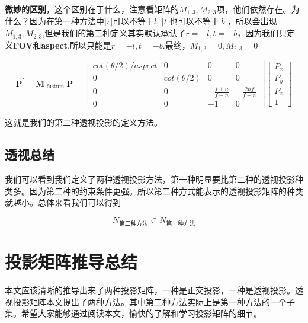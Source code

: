 \documentclass{article} \usepackage{braket} \usepackage{amsmath,amssymb} \usepackage{geometry} \usepackage{graphicx} \usepackage{braket} \usepackage{bm}\usepackage{hyperref} \usepackage{CJKutf8}
\begin{document}
\begin{CJK}{UTF8}{gbsn}
  \textbf{微妙的区别}，这个区别在于什么，注意看矩阵的$M_{1,3},M_{2,3}$项，他们依然存在。为什么？因为在第一种方法中$|r|$可以不等于$l$, $|t|$也可以不等于$|b|$，所以会出现$M_{1,3},M_{2,3}$,但是我们的第二种定义其实默认承认了$r=-l,t=-b$，因为我们只定义\textbf{FOV}和\textbf{aspect},所以只能是$r=-l,t=-b$.最终，$M_{1,3}=0,M_{2,3}=0$

  \begin{equation}
    \label{eq:proj_fov_final}
        \mathbf{P}^{\prime}=\mathbf{M}_{\text { fustum }} \mathbf{P}=
    \left[
      \begin{array}{cccc}
        {cot(\theta/2)/aspect} & {0} & {0} & {0} \\
        {0} & {cot(\theta/2)} & {0} & {0} \\
        {0} & {0} & {-\frac{f+n}{f-n}} & {-\frac{2 n f}{f-n}} \\
        {0} & {0} & {-1} & {0}
      \end{array}\right]
    \left[
      \begin{array}{c}{P_{x}} \\
        {P_{y}} \\
        {P_{z}}
        \\ {1}
      \end{array}
    \right]
  \end{equation}

  这就是我们的第二种透视投影的定义方法。

  \subsection{透视总结}

  我们可以看到我们定义了两种透视投影方法，第一种明显要比第二种的透视投影种类多。因为第二种的约束条件更强。所以第二种方式能表示的透视投影矩阵的种类就越小。总体来看我们可以得到

  \begin{displaymath}
    N_{\mbox{第二种方法}} \subset N_{\mbox{第一种方法}}
  \end{displaymath}

  \section{投影矩阵推导总结}

  本文应该清晰的推导出来了两种投影矩阵，一种是正交投影，一种是透视投影。透视投影矩阵本文提出了两种方法。其中第二种方法实际上是第一种方法的一个子集。希望大家能够通过阅读本文，愉快的了解和学习投影矩阵的细节。
  
\end{CJK}
\end{document}
